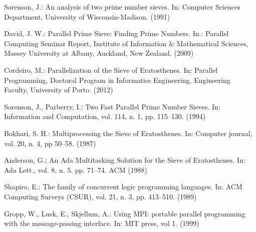 \documentclass[runningheads,a4paper]{llncs}
\begin{document}
\begin{thebibliography}{4}
 Sorenson, J.: An analysis of two prime number sieves. In: Computer Sciences Department, University of Wisconsin-Madison. (1991)

 David, J. W.: Parallel Prime Sieve: Finding Prime Numbers. In.: Parallel Computing Seminar Report, Institute of Information \& Mathematical Sciences, Massey University at Albany, Auckland, New Zealand. (2009)

 Cordeiro, M.: Parallelization of the Sieve of Eratosthenes. In: Parallel Programming, Doctoral Program in Informatics Engineering, Engineering Faculty, University of Porto. (2012)

 Sorenson, J., Parberry, I.: Two Fast Parallel Prime Number Sieves. In: Information and Computation, vol. 114, n. 1, pp. 115--130. (1994)

 Bokhari, S. H.: Multiprocessing the Sieve of Eratosthenes. In: Computer journal, vol. 20, n. 4, pp 50--58. (1987)

 Anderson, G.: An Ada Multitasking Solution for the Sieve of Eratosthenes. In: Ada Lett., vol. 8, n. 5. pp. 71--74. ACM (1988)

 Shapiro, E.: The family of concurrent logic programming languages. In: ACM Computing Surveys (CSUR), vol. 21, n. 3, pp. 413--510. (1989)

 Gropp, W., Lusk, E., Skjellum, A.: Using MPI: portable parallel programming with the message-passing interface. In: MIT press, vol 1. (1999)







\end{thebibliography}
\end{document}
